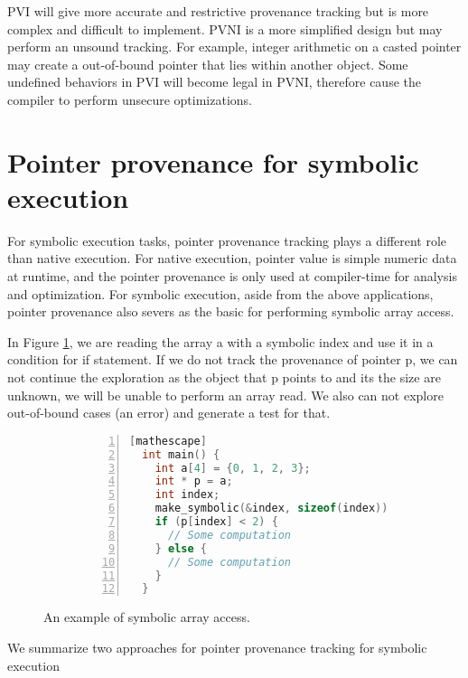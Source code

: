 \documentclass[sigplan, nonacm]{acmart}\settopmatter{printfolios=true,printccs=false,printacmref=false}
\newcommand{\tool}{\textsc{GenSym}\xspace}
\begin{document}
PVI will give more accurate and restrictive provenance tracking but is more complex and difficult to implement. PVNI is a more simplified design but may perform an unsound tracking. For example, integer arithmetic on a casted pointer may create a out-of-bound pointer that lies within another object. Some undefined behaviors in PVI will become legal in PVNI, therefore cause the compiler to perform unsecure optimizations.
\section{Pointer provenance for symbolic execution}\label{symbolicprovenance}
For symbolic execution tasks, pointer provenance tracking plays a different role than native execution. For native execution, pointer value is simple numeric data at runtime, and the pointer provenance is only used at compiler-time for analysis and optimization. For symbolic execution, aside from the above applications, pointer provenance also severs as the basic for performing symbolic array access.\par
In Figure \ref{fig:example}, we are reading the array a with a symbolic index and use it in a condition for if statement. If we do not track the provenance of pointer p, we can not continue the exploration as the object that p points to and its the size are unknown, we will be unable to perform an array read. We also can not explore out-of-bound cases (an error) and generate a test for that.
\begin{figure}[t]
  \centering
  \begin{subfigure}{0.8\textwidth}
  \begin{lstlisting}[style=small,language=C,numbers=left,stepnumber=1,xleftmargin=2em,numberstyle=\ttfamily][mathescape]
  int main() {
    int a[4] = {0, 1, 2, 3};
    int * p = a;
    int index;
    make_symbolic(&index, sizeof(index));
    if (p[index] < 2) {
      // Some computation
    } else {
      // Some computation
    }
  }
  \end{lstlisting}
  \end{subfigure}
  \caption{An example of symbolic array access.}
  \label{fig:example}
  \end{figure}
We summarize two approaches for pointer provenance tracking for symbolic execution
\end{document}
